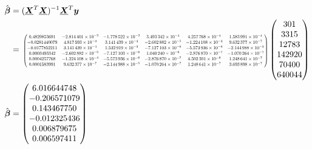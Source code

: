 \documentclass[12pt]{article}
\newcommand{\vect}[1]{\boldsymbol{#1}}
\newcommand{\mat}[1]{\underline{\boldsymbol{#1}}}
\newcommand{\trans}[1]{#1^T}
\newcommand{\est}[1]{\hat{#1}}
\begin{document}
\begin{align}
  \est{\vect{\beta}} & = (\trans{\mat{X}}\mat{X})^{-1}\trans{\mat{X}}\vect{y} \nonumber \\
                     & =
                    \resizebox{0.85\linewidth}{!}{ $
                    \begin{pmatrix}
 0.4829853691 & \num{-2.814401e-02} & \num{-1.778522e-02} & \num{ 3.493342e-04} & \num{ 4.257768e-04} & \num{ 1.583991e-04} \\
-0.0281440079 & \num{ 4.817593e-03} & \num{ 3.141439e-04} & \num{-2.602882e-05} & \num{-1.224108e-04} & \num{ 9.632377e-07} \\
-0.0177852211 & \num{ 3.141439e-04} & \num{ 1.532919e-03} & \num{-7.127103e-06} & \num{-5.573936e-06} & \num{-2.144988e-05} \\
 0.0003493342 & \num{-2.602882e-05} & \num{-7.127103e-06} & \num{ 1.040240e-06} & \num{-2.876870e-07} & \num{-1.070264e-07} \\
 0.0004257768 & \num{-1.224108e-04} & \num{-5.573936e-06} & \num{-2.876870e-07} & \num{ 4.502301e-06} & \num{ 1.248641e-07} \\
 0.0001583991 & \num{ 9.632377e-07} & \num{-2.144988e-05} & \num{-1.070264e-07} & \num{ 1.248641e-07} & \num{ 3.693898e-07}
                  \end{pmatrix}
                    $}
                    \begin{pmatrix}
                      301     \\
                      3315    \\
                      12783   \\
                      142920  \\
                      70400   \\
                      640044  \\
                    \end{pmatrix} \nonumber \\
  \est{\vect{\beta}} & =
                    \begin{pmatrix}
                      6.016644748 \\
                     -0.206571079 \\
                      0.143467750 \\
                     -0.012325436 \\
                      0.006879675 \\
                      0.006597411
                    \end{pmatrix} \label{quad_beta}
\end{align}
\end{document}
